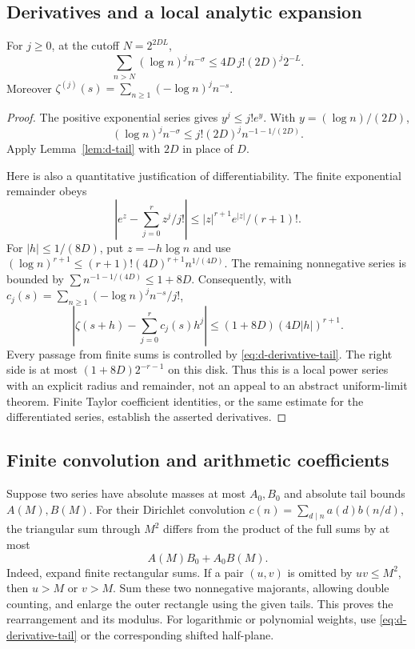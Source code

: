 \subsection{Derivatives and a local analytic expansion}

\begin{lemma}\label{lem:d-derivative-tail}
For \(j\geq0\), at the cutoff \(N=2^{2DL}\),
\[
 \sum_{n>N}(\log n)^j n^{-\sigma}
       \leq4D\,j!(2D)^j2^{-L}.                         \tag{D3}\label{eq:d-derivative-tail}
\]
Moreover
\(\zeta^{(j)}(s)=\sum_{n\geq1}(-\log n)^j n^{-s}\).
\end{lemma}
\begin{proof}
The positive exponential series gives \(y^j\leq j!e^y\).
With \(y=(\log n)/(2D)\),
\[
 (\log n)^j n^{-\sigma}
       \leq j!(2D)^j n^{-1-1/(2D)}.
\]
Apply Lemma~\ref{lem:d-tail} with \(2D\) in place of \(D\).

Here is also a quantitative justification of differentiability.
The finite exponential remainder obeys
\[
 \left|e^z-\sum_{j=0}^r z^j/j!\right|
       \leq |z|^{r+1}e^{|z|}/(r+1)! .
\]
For \(|h|\leq1/(8D)\), put \(z=-h\log n\) and use
\((\log n)^{r+1}\leq(r+1)!(4D)^{r+1}n^{1/(4D)}\).
The remaining nonnegative series is bounded by
\(\sum n^{-1-1/(4D)}\leq1+8D\). Consequently, with
\(c_j(s)=\sum_{n\geq1}(-\log n)^j n^{-s}/j!\),
\[
 \left|\zeta(s+h)-\sum_{j=0}^{r}c_j(s)h^j\right|
       \leq(1+8D)(4D|h|)^{r+1}.                       \tag{D4}\label{eq:d-taylor}
\]
Every passage from finite sums is controlled by \eqref{eq:d-derivative-tail}.
The right side is at most \((1+8D)2^{-r-1}\) on this disk.
Thus this is a local power series with an explicit radius and remainder,
not an appeal to an abstract uniform-limit theorem.
Finite Taylor coefficient identities, or the same estimate for the
differentiated series, establish the asserted derivatives.
\end{proof}

\subsection{Finite convolution and arithmetic coefficients}

Suppose two series have absolute masses at most \(A_0,B_0\) and absolute
tail bounds \(A(M),B(M)\). For their Dirichlet convolution
\(c(n)=\sum_{d\mid n}a(d)b(n/d)\), the triangular sum through \(M^2\)
differs from the product of the full sums by at most
\[
                         A(M)B_0+A_0B(M).             \tag{D5}\label{eq:d-convolution}
\]
Indeed, expand finite rectangular sums. If a pair \((u,v)\) is omitted
by \(uv\leq M^2\), then \(u>M\) or \(v>M\). Sum these two nonnegative
majorants, allowing double counting, and enlarge the outer rectangle
using the given tails. This proves the rearrangement and its modulus.
For logarithmic or polynomial weights, use
\eqref{eq:d-derivative-tail} or the corresponding shifted half-plane.

